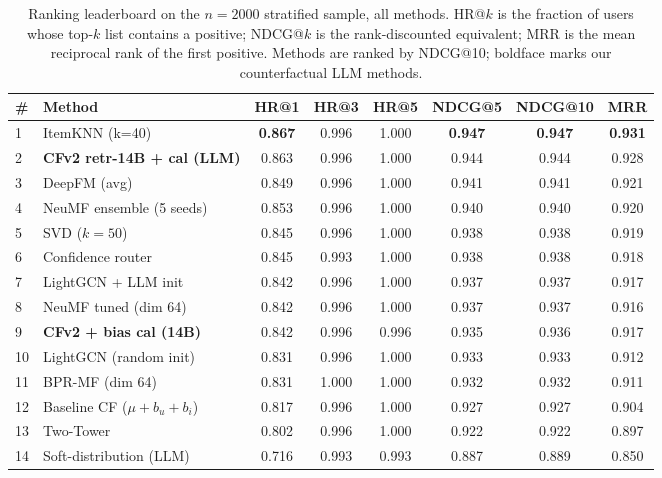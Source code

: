 \documentclass[11pt,a4paper]{article}
\newcommand{\best}[1]{\textcolor{goodgreen}{\textbf{#1}}}
\begin{document}
\begin{table}[H]
\centering
\small
\caption{Ranking leaderboard on the $n{=}2000$ stratified sample, all methods.
HR@$k$ is the fraction of users whose top-$k$ list contains a positive;
NDCG@$k$ is the rank-discounted equivalent; MRR is the mean reciprocal rank
of the first positive. Methods are ranked by NDCG@10; boldface marks our
counterfactual LLM methods.}
\label{tab:ranking_full}
\begin{tabularx}{\linewidth}{lXcccccc}
\toprule
\# & Method & HR@1 & HR@3 & HR@5 & NDCG@5 & NDCG@10 & MRR \\ \midrule
1  & ItemKNN (k=40)                          & \best{0.867} & 0.996 & 1.000 & \best{0.947} & \best{0.947} & \best{0.931} \\
\rowcolor{goodgreen!15}
2  & \textbf{CFv2 retr-14B + cal (LLM)}       & 0.863 & 0.996 & 1.000 & 0.944 & 0.944 & 0.928 \\
3  & DeepFM (avg)                             & 0.849 & 0.996 & 1.000 & 0.941 & 0.941 & 0.921 \\
4  & NeuMF ensemble (5 seeds)                 & 0.853 & 0.996 & 1.000 & 0.940 & 0.940 & 0.920 \\
5  & SVD ($k{=}50$)                           & 0.845 & 0.996 & 1.000 & 0.938 & 0.938 & 0.919 \\
6  & Confidence router                        & 0.845 & 0.993 & 1.000 & 0.938 & 0.938 & 0.918 \\
7  & LightGCN + LLM init                      & 0.842 & 0.996 & 1.000 & 0.937 & 0.937 & 0.917 \\
8  & NeuMF tuned (dim 64)                     & 0.842 & 0.996 & 1.000 & 0.937 & 0.937 & 0.916 \\
\rowcolor{goodgreen!15}
9  & \textbf{CFv2 + bias cal (14B)}           & 0.842 & 0.996 & 0.996 & 0.935 & 0.936 & 0.917 \\
10 & LightGCN (random init)                   & 0.831 & 0.996 & 1.000 & 0.933 & 0.933 & 0.912 \\
11 & BPR-MF (dim 64)                          & 0.831 & 1.000 & 1.000 & 0.932 & 0.932 & 0.911 \\
12 & Baseline CF ($\mu{+}b_u{+}b_i$)          & 0.817 & 0.996 & 1.000 & 0.927 & 0.927 & 0.904 \\
13 & Two-Tower                                & 0.802 & 0.996 & 1.000 & 0.922 & 0.922 & 0.897 \\
14 & Soft-distribution (LLM)                  & 0.716 & 0.993 & 0.993 & 0.887 & 0.889 & 0.850 \\

\end{tabularx}
\end{table}
\end{document}
